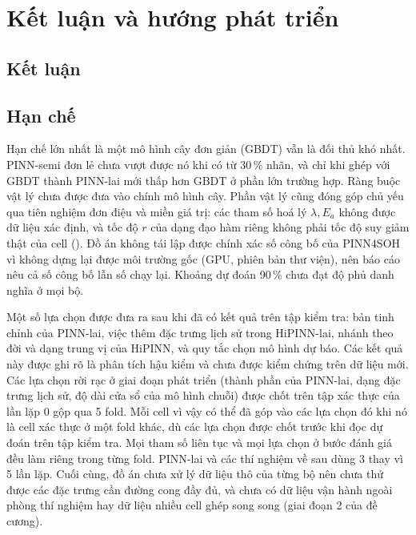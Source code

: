 \chapter{Kết luận và hướng phát triển}
\label{chap:conclusion}\label{ch:ketluan}

\section{Kết luận}



\section{Hạn chế}

Hạn chế lớn nhất là một mô hình cây đơn giản (GBDT) vẫn là đối thủ khó nhất. PINN-semi đơn lẻ chưa vượt được nó khi có
từ 30\,\% nhãn, và chỉ khi ghép với GBDT thành PINN-lai mới thấp hơn GBDT ở phần lớn trường hợp. Ràng buộc vật lý chưa
được đưa vào chính mô hình cây. Phần vật lý cũng đóng góp chủ yếu qua tiên nghiệm đơn điệu và miền giá trị: các tham số
hoá lý $\lambda, E_a$ không được dữ liệu xác định, và tốc độ $r$ của dạng đạo hàm riêng không phải tốc độ suy giảm thật
của cell (). Đồ án không tái lập được chính xác số công bố của PINN4SOH vì không dựng lại được môi trường
gốc (GPU, phiên bản thư viện), nên báo cáo nêu cả số công bố lẫn số chạy lại. Khoảng dự đoán 90\,\% chưa đạt độ phủ danh
nghĩa ở mọi bộ.

Một số lựa chọn được đưa ra sau khi đã có kết quả trên tập kiểm tra: bản tinh chỉnh của PINN-lai, việc thêm đặc trưng
lịch sử trong HiPINN-lai, nhánh theo đời và dạng trung vị của HiPINN, và quy tắc chọn mô hình dự báo. Các kết quả này được
ghi rõ là phân tích hậu kiểm và chưa được kiểm chứng trên dữ liệu mới. Các lựa chọn rời rạc ở giai đoạn phát triển (thành
phần của PINN-lai, dạng đặc trưng lịch sử, độ dài cửa sổ của mô hình chuỗi) được chốt trên tập xác thực của lần lặp 0 gộp
qua 5 fold. Mỗi cell vì vậy có thể đã góp vào các lựa chọn đó khi nó là cell xác thực ở một fold khác, dù các lựa chọn
được chốt trước khi đọc dự đoán trên tập kiểm tra. Mọi tham số liên tục và mọi lựa chọn ở bước đánh giá đều làm riêng trong
từng fold. PINN-lai và các thí nghiệm về sau dùng 3 thay vì 5 lần lặp. Cuối cùng, đồ án chưa xử lý dữ liệu thô của từng bộ
nên chưa thử được các đặc trưng cần đường cong đầy đủ, và chưa có dữ liệu vận hành ngoài phòng thí nghiệm hay dữ liệu nhiều
cell ghép song song (giai đoạn 2 của đề cương).

